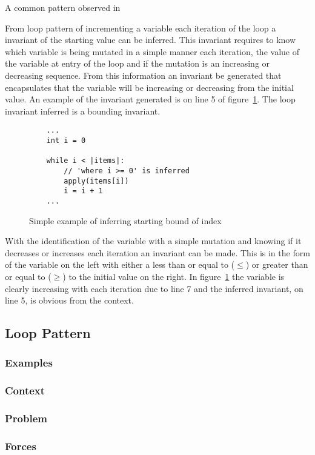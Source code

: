 A common pattern observed in 

From loop pattern of incrementing a variable each iteration of the loop
a invariant of the starting value can be inferred.
This invariant requires to know which variable is being
mutated in a simple manner each iteration,
the value of the variable at entry of the loop and if the mutation is an
increasing or decreasing sequence.
From this information an invariant be generated that encapsulates that the
variable will be increasing or decreasing from the initial value.
An example of the invariant generated is on line 5 of
figure~\ref{lst:whiley-start}.
The loop invariant inferred is a bounding invariant.

\begin{figure}[ht]
\begin{lstlisting}
    ...
    int i = 0

    while i < |items|:
        // 'where i >= 0' is inferred
        apply(items[i])
        i = i + 1
    ...
\end{lstlisting}
\caption{Simple example of inferring starting bound of index}
\label{lst:whiley-start}
\end{figure}

With the identification of the variable with a simple mutation and knowing
if it decreases or increases each iteration an invariant can be made.
This is in the form of the variable on the left with either a less than or
equal to ($\leq$) or greater than or equal to ($\geq$) to the initial value on the
right.
In figure~\ref{lst:whiley-start} the variable  is clearly increasing
with each iteration due to line 7 and the inferred invariant, on line 5, is
obvious from the context.

\subsection{Loop Pattern}

\subsubsection{Examples}
\subsubsection{Context}
\subsubsection{Problem}
\subsubsection{Forces}
